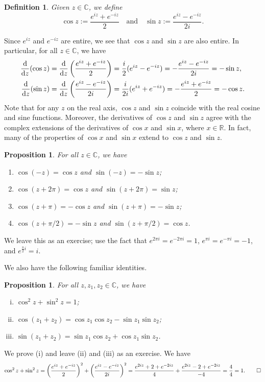 \documentclass[10pt]{article}
\makeatletter
\newcommand{\R}{\mathbb{R}}
\newcommand{\C}{\mathbb{C}}
\theoremstyle{newstyle}
\newtheorem{prop}[thm]{Proposition}
\newtheorem{defn}[thm]{Definition}
\newenvironment{pf}[1][\proofname]{\par
  \pushQED{\qed}%
  \normalfont \topsep0\p@\relax
  \trivlist
  \item[\hskip\labelsep\scshape
  #1\@addpunct{.}]\ignorespaces
}{%
  \popQED\endtrivlist\@endpefalse
}
\makeatother
\begin{document}
\begin{defn}
Given $z \in \C$, we define 
\[ \cos z := \frac{e^{iz} + e^{-iz}}2 \quad \text{and} \quad 
    \sin z := \frac{e^{iz} - e^{-iz}}{2i}. \] 
\end{defn}
Since $e^{iz}$ and $e^{-iz}$ are entire, we see that $\cos z$ and $\sin z$ are also entire. 
In particular, for all $z \in \C$, we have 
\begin{align*}
    \frac{\rm d}{{\rm d}z} (\cos z) &= \frac{\rm d}{{\rm d}z} \left( \frac{e^{iz} + e^{-iz}}2 \right)
    = \frac{i}2 (e^{iz} - e^{-iz}) = - \frac{e^{iz} - e^{-iz}}{2i} = -\sin z, \\
    \frac{\rm d}{{\rm d}z} (\sin z) &= \frac{\rm d}{{\rm d}z} \left( \frac{e^{iz} - e^{-iz}}{2i} \right)
    = \frac{i}{2i} (e^{iz} + e^{-iz}) = - \frac{e^{iz} + e^{-iz}}{2} = -\cos z.
\end{align*}
Note that for any $z$ on the real axis, $\cos z$ and $\sin z$ coincide with the real cosine and sine 
functions. Moreover, the derivatives of $\cos z$ and $\sin z$ agree with the complex extensions 
of the derivatives of $\cos x$ and $\sin x$, where $x \in \R$. In fact, many of the properties of 
$\cos x$ and $\sin x$ extend to $\cos z$ and $\sin z$. 

\begin{prop}
For all $z \in \C$, we have 
\begin{enumerate}[(1)]
    \item $\cos(-z) = \cos z$ and $\sin(-z) = -\sin z$;
    \item $\cos(z+2\pi) = \cos z$ and $\sin(z + 2\pi) = \sin z$;
    \item $\cos(z + \pi) = -\cos z$ and $\sin(z + \pi) = -\sin z$;
    \item $\cos(z + \pi/2) = -\sin z$ and $\sin(z + \pi/2) = \cos z$. 
\end{enumerate}
\end{prop}
\begin{pf}
We leave this as an exercise; use the fact that $e^{2\pi i} = e^{-2\pi i} = 1$, 
$e^{\pi i} = e^{-\pi i} = -1$, and $e^{\frac\pi2i} = i$. 
\end{pf}

We also have the following familiar identities.

\begin{prop}
For all $z, z_1, z_2 \in \C$, we have 
\begin{enumerate}[(i)]
    \item $\cos^2 z + \sin^2 z = 1$;
    \item $\cos(z_1+z_2) = \cos z_1 \cos z_2 - \sin z_1 \sin z_2$;
    \item $\sin(z_1+z_2) = \sin z_1 \cos z_2 + \cos z_1 \sin z_2$.
\end{enumerate}
\end{prop}
\begin{pf}
We prove (i) and leave (ii) and (iii) as an exercise. We have 
\[ \cos^2 z + \sin^2 z = \left( \frac{e^{iz} + e^{-iz}}2 \right)^2 + 
\left( \frac{e^{iz} - e^{-iz}}{2i} \right)^2 = 
\frac{e^{2iz} + 2 + e^{-2iz}}4 + \frac{e^{2iz} - 2 + e^{-2iz}}{-4} = \frac44 = 1. \qedhere \]
\end{pf}
\end{document}

